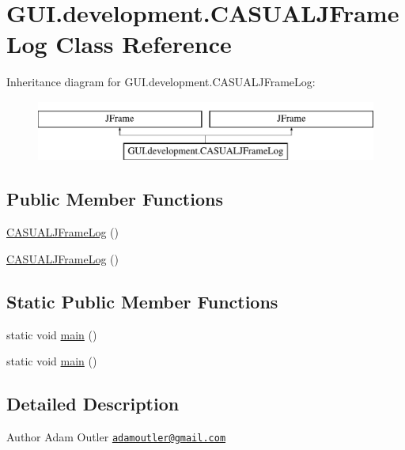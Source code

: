 \hypertarget{classGUI_1_1development_1_1CASUALJFrameLog}{\section{G\-U\-I.\-development.\-C\-A\-S\-U\-A\-L\-J\-Frame\-Log Class Reference}
\label{classGUI_1_1development_1_1CASUALJFrameLog}
}
Inheritance diagram for G\-U\-I.\-development.\-C\-A\-S\-U\-A\-L\-J\-Frame\-Log\-:\begin{figure}[H]
\begin{center}
\leavevmode
\includegraphics[height=2.000000cm]{classGUI_1_1development_1_1CASUALJFrameLog}
\end{center}
\end{figure}
\subsection*{Public Member Functions}
\begin{DoxyCompactItemize}
\item 
\hyperlink{classGUI_1_1development_1_1CASUALJFrameLog_a9ef7910e9b9d9d8c2b00af212b7e33c0}{C\-A\-S\-U\-A\-L\-J\-Frame\-Log} ()
\item 
\hyperlink{classGUI_1_1development_1_1CASUALJFrameLog_a9ef7910e9b9d9d8c2b00af212b7e33c0}{C\-A\-S\-U\-A\-L\-J\-Frame\-Log} ()
\end{DoxyCompactItemize}
\subsection*{Static Public Member Functions}
\begin{DoxyCompactItemize}
\item 
static void \hyperlink{classGUI_1_1development_1_1CASUALJFrameLog_aad38c589809152549a48f9f65af4f1b6}{main} ()
\item 
static void \hyperlink{classGUI_1_1development_1_1CASUALJFrameLog_aad38c589809152549a48f9f65af4f1b6}{main} ()
\end{DoxyCompactItemize}


\subsection{Detailed Description}
\begin{DoxyAuthor}{Author}
Adam Outler \href{mailto:adamoutler@gmail.com}{\tt adamoutler@gmail.\-com} 
\end{DoxyAuthor}


